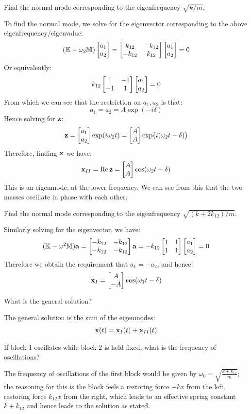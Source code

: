 \begin{p}
Find the normal mode corresponding to the eigenfrequency $\sqrt{k/m}$.
\end{p}
\begin{s}
To find the normal mode, we solve for the eigenvector corresponding to the above eigenfrequency/eigenvalue:
\[(\mathbb{K} - \omega_2\mathbb{M})\begin{bmatrix}a_1 \\ a_2\end{bmatrix} = \begin{bmatrix}k_{12} & - k_{12} \\ -k_{12} & k_{12}\end{bmatrix}\begin{bmatrix}a_1 \\ a_2\end{bmatrix} = 0\]
Or equivalently:
\[k_{12}\begin{bmatrix}1 & -1 \\ -1 & 1\end{bmatrix}\begin{bmatrix}a_1 \\ a_2\end{bmatrix} = 0\]
From which we can see that the restriction on $a_1, a_2$ is that:
\[a_1 = a_2 = A\exp(-i\delta)\]
Hence solving for $\mathbf{z}$:
\[\mathbf{z} = \begin{bmatrix}a_1 \\ a_2\end{bmatrix}\exp(i\omega_2 t) = \begin{bmatrix}A \\ A\end{bmatrix}\exp(i(\omega_2 t - \delta))\]
Therefore, finding $\mathbf{x}$ we have:
\[\mathbf{x}_{II} = \Re\mathbf{z} = \begin{bmatrix}A \\ A\end{bmatrix}\cos(\omega_2 t - \delta)\]
This is an eigenmode, at the lower frequency. We can see from this that the two masses oscillate in phase with each other.
\end{s}

\begin{p}
Find the normal mode corresponding to the eigenfrequency $\sqrt{(k+2k_{12})/m}$.
\end{p}
\begin{s}
Similarly solving for the eigenvector, we have:
\[(\mathbb{K} - \omega^2\mathbb{M})\mathbf{a} = \begin{bmatrix}-k_{12} & -k_{12} \\ -k_{12} & -k_{12}\end{bmatrix}\mathbf{a} = -k_{12}\begin{bmatrix}1 & 1 \\ 1 & 1\end{bmatrix}\begin{bmatrix}a_1 \\ a_2\end{bmatrix} = 0\]
Therefore we obtain the requirement that $a_1 = -a_2$, and hence:
\[\mathbf{x}_I = \begin{bmatrix}A \\ -A\end{bmatrix}\cos(\omega_1 t - \delta)\]
\end{s}

\begin{p}
What is the general solution?
\end{p}
\begin{s}
The general solution is the sum of the eigenmodes:
\[\mathbf{x}(t) = \mathbf{x}_I(t) + \mathbf{x}_{II}(t)\]
\end{s}

\begin{p}
If block 1 oscillates while block 2 is held fixed, what is the frequency of oscillations?
\end{p}
\begin{s}
The frequency of oscillations of the first block would be given by $\omega_0 = \sqrt{\frac{k + k_{12}}{m}}$; the reasoning for this is the block feels a restoring force $-kx$ from the left, restoring force $k_{12}x$ from the right, which leads to an effective spring constant $k + k_{12}$ and hence leads to the solution as stated.
\end{s}

